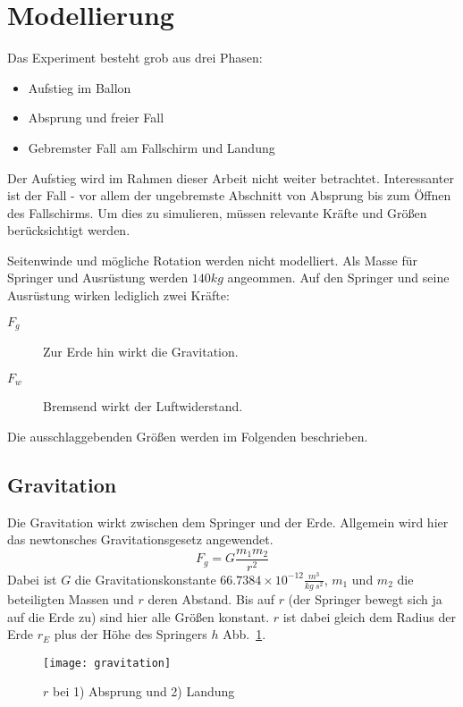 \section{Modellierung}\label{sec:modellierung}

Das Experiment besteht grob aus drei Phasen:
\begin{itemize}
  \item Aufstieg im Ballon
  \item Absprung und freier Fall
  \item Gebremster Fall am Fallschirm und Landung
\end{itemize}
Der Aufstieg wird im Rahmen dieser Arbeit nicht weiter betrachtet.
Interessanter ist der Fall - vor allem der ungebremste Abschnitt von Absprung bis zum Öffnen des Fallschirms.
Um dies zu simulieren, müssen relevante Kräfte und Größen berücksichtigt werden. %

Seitenwinde und mögliche Rotation werden nicht modelliert.
Als Masse für Springer und Ausrüstung werden $140kg$ angeommen.
Auf den Springer und seine Ausrüstung wirken lediglich zwei Kräfte:
\begin{description}
  \item[$F_g$] Zur Erde hin wirkt die Gravitation.
  \item[$F_w$] Bremsend wirkt der Luftwiderstand.%
\end{description}

Die ausschlaggebenden Größen werden im Folgenden beschrieben.

\subsection{Gravitation}
Die Gravitation wirkt zwischen dem Springer und der Erde.
Allgemein wird hier das newtonsches Gravitationsgesetz angewendet.
\begin{equation}
F_g=G \frac{m_1 m_2}{r^2}
\end{equation}
Dabei ist $G$ die Gravitationskonstante $66.7384\times 10^{-12} \frac{m^3}{kg\ s^2}$, $m_1$ und $m_2$ die beteiligten Massen und $r$ deren Abstand.
Bis auf $r$ (der Springer bewegt sich ja auf die Erde zu) sind hier alle Größen konstant.
$r$ ist dabei gleich dem Radius der Erde $r_E$ plus der Höhe des Springers $h$ \vgl Abb.~\ref{fig:gravitation}.
\begin{figure}[h]
  \centering
  \texttt{[image: gravitation]}
  \caption{$r$ bei 1) Absprung und 2) Landung}
  \label{fig:gravitation}
\end{figure}

